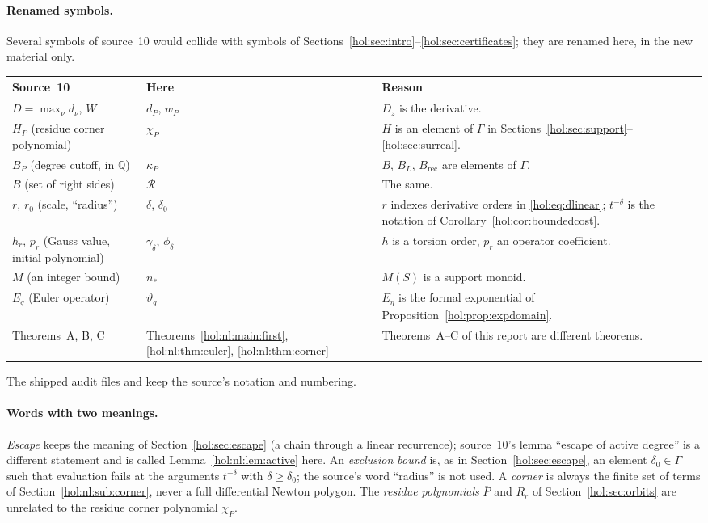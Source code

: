 \documentclass[11pt]{article}
\numberwithin{equation}{section}
\theoremstyle{definition}
\theoremstyle{remark}
\newcommand{\Q}{\mathbb Q}
\begin{document}
\paragraph{Renamed symbols.}
Several symbols of source~10 would collide with symbols of
Sections~\ref{hol:sec:intro}--\ref{hol:sec:certificates}; they are renamed
here, in the new material only.
\begin{center}
\small
\begin{tabularx}{\textwidth}{@{}l l X@{}}
\toprule
Source~10 & Here & Reason\\
\midrule
$D=\max_\nu d_\nu$, $W$ & $d_P$, $w_P$ & $D_z$ is the derivative.\\
$H_P$ (residue corner polynomial) & $\chi_P$ & $H$ is an element of $\Gamma$
in Sections~\ref{hol:sec:support}--\ref{hol:sec:surreal}.\\
$B_P$ (degree cutoff, in $\Q$) & $\kappa_P$ & $B$, $B_L$, $B_{\mathrm{rec}}$
are elements of $\Gamma$.\\
$B$ (set of right sides) & $\mathcal R$ & The same.\\
$r$, $r_0$ (scale, ``radius'') & $\delta$, $\delta_0$ & $r$ indexes
derivative orders in \eqref{hol:eq:dlinear}; $t^{-\delta}$ is the notation
of Corollary~\ref{hol:cor:boundedcost}.\\
$h_r$, $p_r$ (Gauss value, initial polynomial) & $\gamma_\delta$,
$\phi_\delta$ & $h$ is a torsion order, $p_r$ an operator coefficient.\\
$M$ (an integer bound) & $n_\ast$ & $M(S)$ is a support monoid.\\
$E_q$ (Euler operator) & $\vartheta_q$ & $E_\eta$ is the formal exponential
of Proposition~\ref{hol:prop:expdomain}.\\
Theorems~A, B, C & Theorems~\ref{hol:nl:main:first}, \ref{hol:nl:thm:euler},
\ref{hol:nl:thm:corner} & Theorems~A--C of this report are different
theorems.\\
\bottomrule
\end{tabularx}
\end{center}
The shipped audit files  and
 keep the source's
notation and numbering.

\paragraph{Words with two meanings.}
\emph{Escape} keeps the meaning of Section~\ref{hol:sec:escape} (a chain
through a linear recurrence); source~10's lemma ``escape of active degree''
is a different statement and is called Lemma~\ref{hol:nl:lem:active} here.
An \emph{exclusion bound} is, as in Section~\ref{hol:sec:escape}, an element
$\delta_0\in\Gamma$ such that evaluation fails at the arguments $t^{-\delta}$
with $\delta\ge\delta_0$; the source's word ``radius'' is not used. A
\emph{corner} is always the finite set of terms of
Section~\ref{hol:nl:sub:corner}, never a full differential Newton polygon.
The \emph{residue polynomials} $\overline P$ and $R_r$ of
Section~\ref{hol:sec:orbits} are unrelated to the residue corner polynomial
$\chi_P$.
\end{document}
